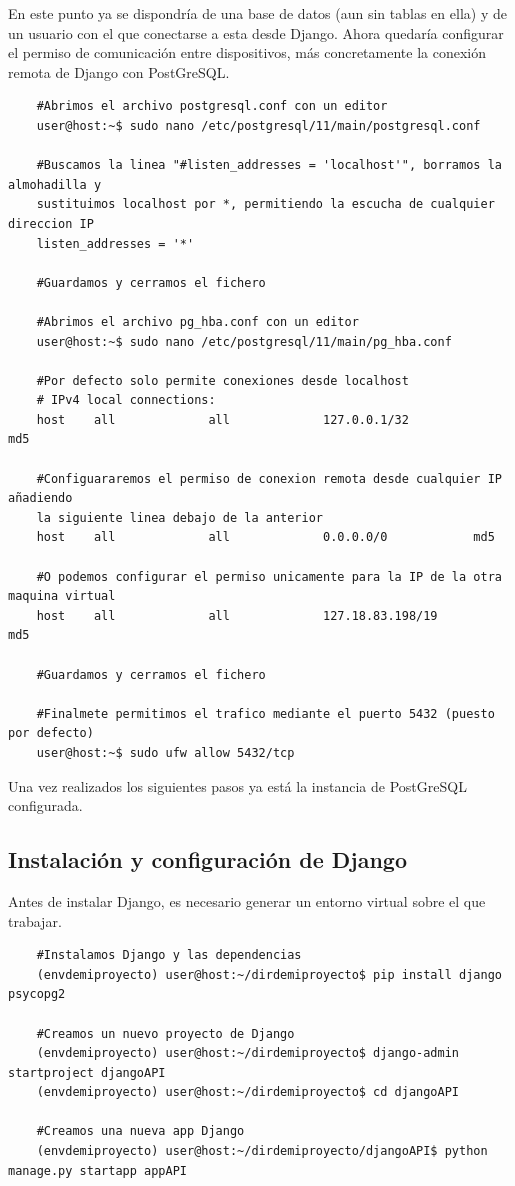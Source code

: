 En este punto ya se dispondría de una base de datos (aun sin tablas en ella) y de un usuario con el que conectarse a esta desde Django.\newline
\newline
Ahora quedaría configurar el permiso de comunicación entre dispositivos, más concretamente la conexión remota de Django con PostGreSQL.

\begin{verbatim}
	#Abrimos el archivo postgresql.conf con un editor
	user@host:~$ sudo nano /etc/postgresql/11/main/postgresql.conf
	
	#Buscamos la linea "#listen_addresses = 'localhost'", borramos la almohadilla y
	sustituimos localhost por *, permitiendo la escucha de cualquier direccion IP
	listen_addresses = '*'
	
	#Guardamos y cerramos el fichero
	
	#Abrimos el archivo pg_hba.conf con un editor
	user@host:~$ sudo nano /etc/postgresql/11/main/pg_hba.conf
	
	#Por defecto solo permite conexiones desde localhost
	# IPv4 local connections: 
	host    all             all             127.0.0.1/32            md5 
	
	#Configuararemos el permiso de conexion remota desde cualquier IP añadiendo
	la siguiente linea debajo de la anterior
	host    all             all             0.0.0.0/0            md5 
	
	#O podemos configurar el permiso unicamente para la IP de la otra maquina virtual
	host    all             all             127.18.83.198/19            md5 
	
	#Guardamos y cerramos el fichero
	
	#Finalmete permitimos el trafico mediante el puerto 5432 (puesto por defecto)
	user@host:~$ sudo ufw allow 5432/tcp
\end{verbatim}

Una vez realizados los siguientes pasos ya está la instancia de PostGreSQL configurada.

\subsection{Instalación y configuración de Django}
Antes de instalar Django, es necesario generar un entorno virtual sobre el que trabajar.

\begin{verbatim}
	#Instalamos Django y las dependencias
	(envdemiproyecto) user@host:~/dirdemiproyecto$ pip install django psycopg2
	
	#Creamos un nuevo proyecto de Django
	(envdemiproyecto) user@host:~/dirdemiproyecto$ django-admin startproject djangoAPI
	(envdemiproyecto) user@host:~/dirdemiproyecto$ cd djangoAPI
	
	#Creamos una nueva app Django
	(envdemiproyecto) user@host:~/dirdemiproyecto/djangoAPI$ python manage.py startapp appAPI
\end{verbatim}

